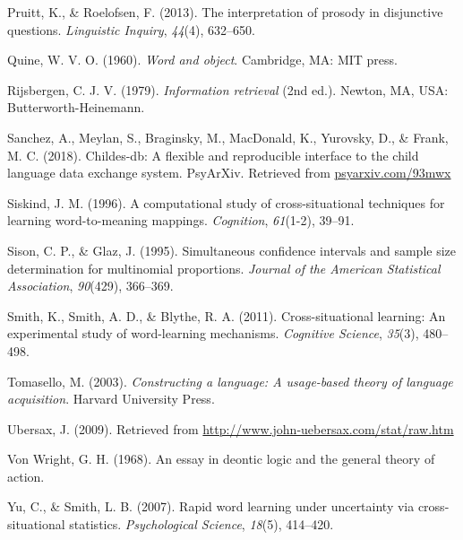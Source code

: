 \documentclass[,man,floatsintext]{apa6}
\begin{document}
\leavevmode\hypertarget{ref-pruitt2013interpretation}{}%
Pruitt, K., \& Roelofsen, F. (2013). The interpretation of prosody in disjunctive questions. \emph{Linguistic Inquiry}, \emph{44}(4), 632--650.

\leavevmode\hypertarget{ref-quine1960word}{}%
Quine, W. V. O. (1960). \emph{Word and object}. Cambridge, MA: MIT press.

\leavevmode\hypertarget{ref-Rijsbergen1979}{}%
Rijsbergen, C. J. V. (1979). \emph{Information retrieval} (2nd ed.). Newton, MA, USA: Butterworth-Heinemann.

\leavevmode\hypertarget{ref-sanchez2018childes}{}%
Sanchez, A., Meylan, S., Braginsky, M., MacDonald, K., Yurovsky, D., \& Frank, M. C. (2018). Childes-db: A flexible and reproducible interface to the child language data exchange system. PsyArXiv. Retrieved from \url{psyarxiv.com/93mwx}

\leavevmode\hypertarget{ref-siskind1996computational}{}%
Siskind, J. M. (1996). A computational study of cross-situational techniques for learning word-to-meaning mappings. \emph{Cognition}, \emph{61}(1-2), 39--91.

\leavevmode\hypertarget{ref-sison1995simultaneous}{}%
Sison, C. P., \& Glaz, J. (1995). Simultaneous confidence intervals and sample size determination for multinomial proportions. \emph{Journal of the American Statistical Association}, \emph{90}(429), 366--369.

\leavevmode\hypertarget{ref-smith2011cross}{}%
Smith, K., Smith, A. D., \& Blythe, R. A. (2011). Cross-situational learning: An experimental study of word-learning mechanisms. \emph{Cognitive Science}, \emph{35}(3), 480--498.

\leavevmode\hypertarget{ref-tomasello2003constructing}{}%
Tomasello, M. (2003). \emph{Constructing a language: A usage-based theory of language acquisition}. Harvard University Press.

\leavevmode\hypertarget{ref-ubersax2009}{}%
Ubersax, J. (2009). Retrieved from \url{http://www.john-uebersax.com/stat/raw.htm}

\leavevmode\hypertarget{ref-von1968essay}{}%
Von Wright, G. H. (1968). An essay in deontic logic and the general theory of action.

\leavevmode\hypertarget{ref-yu2007rapid}{}%
Yu, C., \& Smith, L. B. (2007). Rapid word learning under uncertainty via cross-situational statistics. \emph{Psychological Science}, \emph{18}(5), 414--420.
\end{document}
